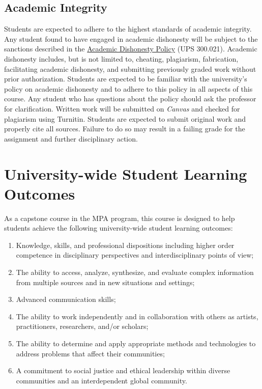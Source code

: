 \documentclass[12pt, letterpaper]{article}
\begin{document}
\subsection*{Academic Integrity}
Students are expected to adhere to the highest standards of academic integrity. Any student found to have engaged in academic dishonesty will be subject to the sanctions described in the \href{https://www.fullerton.edu/senate/publications_policies_resolutions/ups/UPS%20300/UPS%20300.021.pdf}{Academic Dishonesty Policy} (UPS 300.021). Academic dishonesty includes, but is not limited to, cheating, plagiarism, fabrication, facilitating academic dishonesty, and submitting previously graded work without prior authorization. Students are expected to be familiar with the university's policy on academic dishonesty and to adhere to this policy in all aspects of this course. Any student who has questions about the policy should ask the professor for clarification.
\vspace{1ex}    
\noindent Written work will be submitted on \emph{Canvas} and checked for plagiarism using Turnitin. Students are expected to submit original work and properly cite all sources. Failure to do so may result in a failing grade for the assignment and further disciplinary action.

\section{University-wide Student Learning Outcomes}
As a capstone course in the MPA program, this course is designed to help students achieve the following university-wide student learning outcomes:
\begin{enumerate}
    \item Knowledge, skills, and professional dispositions including higher order competence in disciplinary perspectives and interdisciplinary points of view;
    \item The ability to access, analyze, synthesize, and evaluate complex information from multiple sources and in new situations and settings;
    \item Advanced communication skills;
    \item The ability to work independently and in collaboration with others as artists, practitioners, researchers, and/or scholars;
    \item The ability to determine and apply appropriate methods and technologies to address problems that affect their communities; 
    \item A commitment to social justice and ethical leadership within diverse communities and an interdependent global community.
\end{enumerate}
\end{document}
